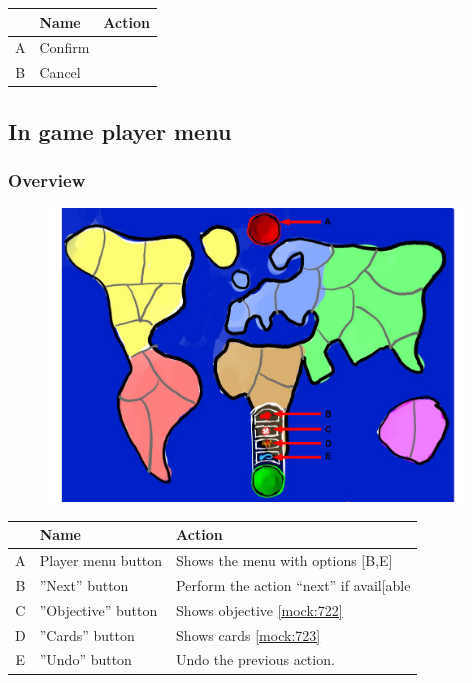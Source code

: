 \documentclass[12pt,a4paper]{article}
\begin{document}
\begin{table}[H]
\small
\centering
\begin{tabular}{c|p{5cm}|p{7cm}}
& Name & Action \\ \hline\hline
A
&Confirm
\\B
&Cancel
\end{tabular}
\end{table}

\subsection{In game player menu}\label{mock:72}

\subsubsection{Overview}\label{mock:721}

\begin{figure}[H]
  \centering
  \includegraphics[width=11cm]{pic/mocks/2-1.pdf}
\end{figure}

\begin{table}[H]
\small
\centering
\begin{tabular}{c|p{5cm}|p{7cm}}
& Name & Action \\ \hline\hline
A
&Player menu button
&Shows the menu with options [B,E]
\\B
&''Next'' button
&Perform the action “next” if avail[able
\\C
&''Objective'' button
&Shows objective \ref{mock:722}
\\D
&''Cards'' button
&Shows cards \ref{mock:723}
\\E
&''Undo'' button
&Undo the previous action.
\end{tabular}
\end{table}
\end{document}
